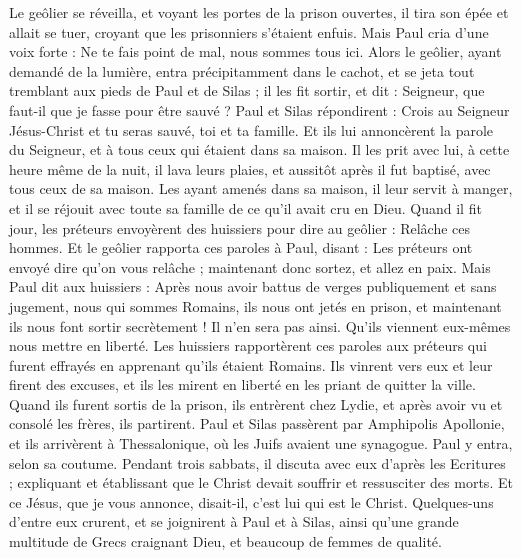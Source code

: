 \begin{multicols}{2}
Le geôlier se réveilla, et voyant les portes de la prison ouvertes, il tira son épée et allait se tuer, croyant que les prisonniers s’étaient enfuis.
Mais Paul cria d’une voix forte : Ne te fais point de mal, nous sommes tous ici.
Alors le geôlier, ayant demandé de la lumière, entra précipitamment dans le cachot, et se jeta tout tremblant aux pieds de Paul et de Silas ;
il les fit sortir, et dit : Seigneur, que faut-il que je fasse pour être sauvé ?
Paul et Silas répondirent : Crois au Seigneur Jésus-Christ et tu seras sauvé, toi et ta famille.
Et ils lui annoncèrent la parole du Seigneur, et à tous ceux qui étaient dans sa maison.
Il les prit avec lui, à cette heure même de la nuit, il lava leurs plaies, et aussitôt après il fut baptisé, avec tous ceux de sa maison.
Les ayant amenés dans sa maison, il leur servit à manger, et il se réjouit avec toute sa famille de ce qu’il avait cru en Dieu.
Quand il fit jour, les préteurs envoyèrent des huissiers pour dire au geôlier : Relâche ces hommes.
Et le geôlier rapporta ces paroles à Paul, disant : Les préteurs ont envoyé dire qu'on vous relâche ; maintenant donc sortez, et allez en paix.
Mais Paul dit aux huissiers : Après nous avoir battus de verges publiquement et sans jugement, nous qui sommes Romains, ils nous ont jetés en prison, et maintenant ils nous font sortir secrètement ! Il n'en sera pas ainsi. Qu’ils viennent eux-mêmes nous mettre en liberté.
Les huissiers rapportèrent ces paroles aux préteurs qui furent effrayés en apprenant qu'ils étaient Romains.
Ils vinrent vers eux et leur firent des excuses, et ils les mirent en liberté en les priant de quitter la ville.
Quand ils furent sortis de la prison, ils entrèrent chez Lydie, et après avoir vu et consolé les frères, ils partirent.
\VerseOne{}Paul et Silas passèrent par Amphipolis Apollonie, et ils arrivèrent à Thessalonique, où les Juifs avaient une synagogue.
Paul y entra, selon sa coutume. Pendant trois sabbats, il discuta avec eux d’après les Ecritures ;
expliquant et établissant que le Christ devait souffrir et ressusciter des morts. Et ce Jésus, que je vous annonce, disait-il, c’est lui qui est le Christ.
Quelques-uns d'entre eux crurent, et se joignirent à Paul et à Silas, ainsi qu’une grande multitude de Grecs craignant Dieu, et beaucoup de femmes de qualité.

\end{multicols}
